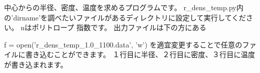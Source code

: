 中心からの半径、密度、温度を求めるプログラムです。
r_dens_temp.py内の'dirname'を調べたいファイルがあるディレクトリに設定して実行してください。
nはポリトロープ 指数です。
出力ファイルは下の方にある

f = open('r_dens_temp_1.0_1100.data', 'w')
を適宜変更することで任意のファイルに書き込むことができます。
１行目に半径、２行目に密度、３行目に温度が書き込まれます。
